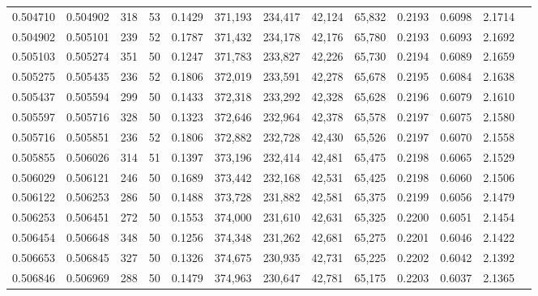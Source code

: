 \begin{tabular}{rrrrrrrrrrrrr}
0.504710 & 0.504902 &   318 &  53 &                                     0.1429 & 371,193 & 234,417 &  42,124 &  65,832 & 0.2193 & 0.6098 & 2.1714 \\
0.504902 & 0.505101 &   239 &  52 &                                     0.1787 & 371,432 & 234,178 &  42,176 &  65,780 & 0.2193 & 0.6093 & 2.1692 \\
0.505103 & 0.505274 &   351 &  50 &                                     0.1247 & 371,783 & 233,827 &  42,226 &  65,730 & 0.2194 & 0.6089 & 2.1659 \\
0.505275 & 0.505435 &   236 &  52 &                                     0.1806 & 372,019 & 233,591 &  42,278 &  65,678 & 0.2195 & 0.6084 & 2.1638 \\
0.505437 & 0.505594 &   299 &  50 &                                     0.1433 & 372,318 & 233,292 &  42,328 &  65,628 & 0.2196 & 0.6079 & 2.1610 \\
0.505597 & 0.505716 &   328 &  50 &                                     0.1323 & 372,646 & 232,964 &  42,378 &  65,578 & 0.2197 & 0.6075 & 2.1580 \\
0.505716 & 0.505851 &   236 &  52 &                                     0.1806 & 372,882 & 232,728 &  42,430 &  65,526 & 0.2197 & 0.6070 & 2.1558 \\
0.505855 & 0.506026 &   314 &  51 &                                     0.1397 & 373,196 & 232,414 &  42,481 &  65,475 & 0.2198 & 0.6065 & 2.1529 \\
0.506029 & 0.506121 &   246 &  50 &                                     0.1689 & 373,442 & 232,168 &  42,531 &  65,425 & 0.2198 & 0.6060 & 2.1506 \\
0.506122 & 0.506253 &   286 &  50 &                                     0.1488 & 373,728 & 231,882 &  42,581 &  65,375 & 0.2199 & 0.6056 & 2.1479 \\
0.506253 & 0.506451 &   272 &  50 &                                     0.1553 & 374,000 & 231,610 &  42,631 &  65,325 & 0.2200 & 0.6051 & 2.1454 \\
0.506454 & 0.506648 &   348 &  50 &                                     0.1256 & 374,348 & 231,262 &  42,681 &  65,275 & 0.2201 & 0.6046 & 2.1422 \\
0.506653 & 0.506845 &   327 &  50 &                                     0.1326 & 374,675 & 230,935 &  42,731 &  65,225 & 0.2202 & 0.6042 & 2.1392 \\
0.506846 & 0.506969 &   288 &  50 &                                     0.1479 & 374,963 & 230,647 &  42,781 &  65,175 & 0.2203 & 0.6037 & 2.1365 \\

\end{tabular}
